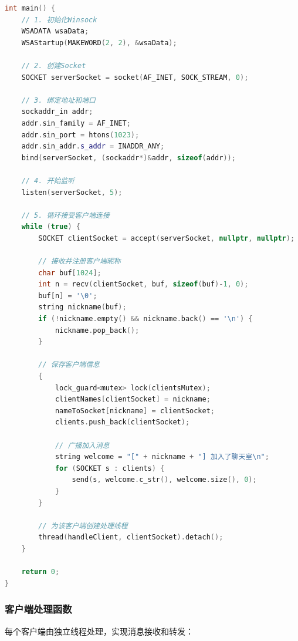 \documentclass[12pt, a4paper]{article}
\begin{document}
\begin{lstlisting}[language=c++]
int main() {
    // 1. 初始化Winsock
    WSADATA wsaData;
    WSAStartup(MAKEWORD(2, 2), &wsaData);
    
    // 2. 创建Socket
    SOCKET serverSocket = socket(AF_INET, SOCK_STREAM, 0);
    
    // 3. 绑定地址和端口
    sockaddr_in addr;
    addr.sin_family = AF_INET;
    addr.sin_port = htons(1023);
    addr.sin_addr.s_addr = INADDR_ANY;
    bind(serverSocket, (sockaddr*)&addr, sizeof(addr));
    
    // 4. 开始监听
    listen(serverSocket, 5);
    
    // 5. 循环接受客户端连接
    while (true) {
        SOCKET clientSocket = accept(serverSocket, nullptr, nullptr);
        
        // 接收并注册客户端昵称
        char buf[1024];
        int n = recv(clientSocket, buf, sizeof(buf)-1, 0);
        buf[n] = '\0';
        string nickname(buf);
        if (!nickname.empty() && nickname.back() == '\n') {
            nickname.pop_back();
        }
        
        // 保存客户端信息
        {
            lock_guard<mutex> lock(clientsMutex);
            clientNames[clientSocket] = nickname;
            nameToSocket[nickname] = clientSocket;
            clients.push_back(clientSocket);
            
            // 广播加入消息
            string welcome = "[" + nickname + "] 加入了聊天室\n";
            for (SOCKET s : clients) {
                send(s, welcome.c_str(), welcome.size(), 0);
            }
        }
        
        // 为该客户端创建处理线程
        thread(handleClient, clientSocket).detach();
    }
    
    return 0;
}
\end{lstlisting}

\subsubsection{客户端处理函数}

每个客户端由独立线程处理，实现消息接收和转发：
\end{document}
